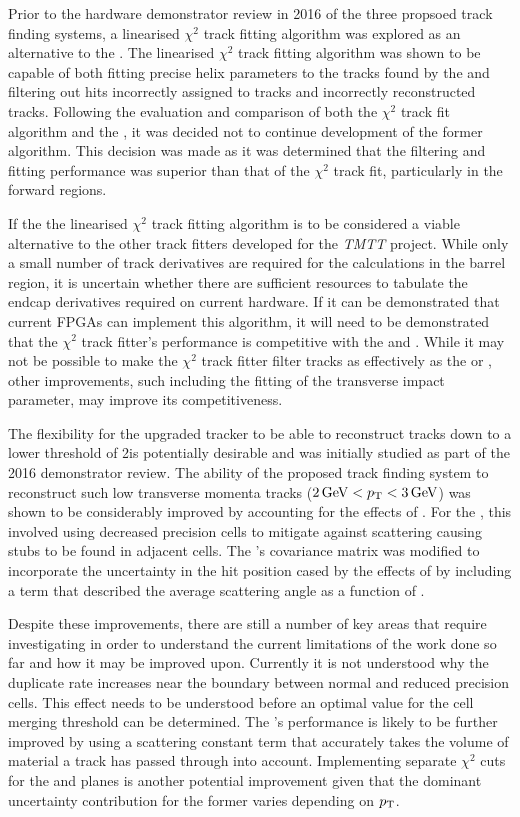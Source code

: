 Prior to the hardware demonstrator review in 2016 of the three propsoed track finding systems, a linearised $\chi^{2}$ track fitting algorithm was explored as an alternative to the \KF.
The linearised $\chi^{2}$ track fitting algorithm was shown to be capable of both fitting precise helix parameters to the tracks found by the \HT and filtering out hits incorrectly assigned to tracks and incorrectly reconstructed tracks.
Following the evaluation and comparison of both the $\chi^{2}$ track fit algorithm and the \KF, it was decided not to continue development of the former algorithm.
This decision was made as it was determined that the \KF filtering and fitting performance was superior than that of the $\chi^{2}$ track fit, particularly in the forward regions.

If the the linearised $\chi^{2}$ track fitting algorithm is to be considered a viable alternative to the other track fitters developed for the \emph{TMTT} project.
While only a small number of track derivatives are required for the calculations in the barrel region, it is uncertain whether there are sufficient resources to tabulate the endcap derivatives required on current hardware.
If it can be demonstrated that current FPGAs can implement this algorithm, it will need to be demonstrated that the $\chi^{2}$ track fitter's performance is competitive with the \KF and \LR.
While it may not be possible to make the $\chi^{2}$ track fitter filter tracks as effectively as the \KF or \LR , other improvements, such including the fitting of the transverse impact parameter, may improve its competitiveness.


The flexibility for the upgraded tracker to be able to reconstruct tracks down to a lower \pT threshold of 2\GeV is potentially desirable and was initially studied as part of the 2016 demonstrator review.
The ability of the proposed track finding system to reconstruct such low transverse momenta tracks ($2\,\text{Ge\hspace{-.08em}V} < p_{\mathrm{T}} < 3\,\text{Ge\hspace{-.08em}V}$) was shown to be considerably improved by accounting for the effects of \MS. 
For the \HT, this involved using decreased precision \HT cells to mitigate against scattering causing stubs to be found in adjacent cells.
The \KF's covariance matrix was modified to incorporate the uncertainty in the hit position cased by the effects of \MS by including a term that described the average scattering angle as a function of \pT.

Despite these improvements, there are still a number of key areas that require investigating in order to understand the current limitations of the work done so far and how it may be improved upon.
Currently it is not understood why the duplicate rate increases near the boundary between normal and reduced precision \HT cells.
This effect needs to be understood before an optimal value for the cell merging threshold can be determined.
The \KF's performance is likely to be further improved by using a scattering constant term that accurately takes the volume of material a track has passed through into account.
Implementing separate \KF $\chi^{2}$ cuts for the \rphi and \rz planes is another potential improvement given that the dominant uncertainty contribution for the former varies depending on $p_{\mathrm{T}}$.

